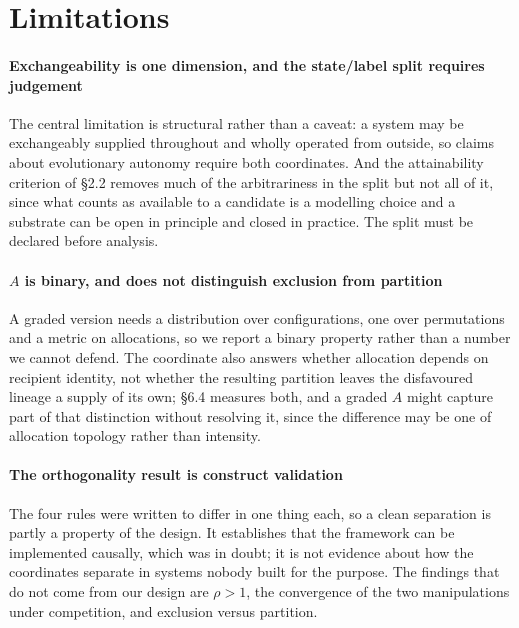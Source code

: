\documentclass[review,3p,times]{elsarticle}
\begin{document}
\section{Limitations}

\paragraph{Exchangeability is one dimension, and the state/label split
requires judgement} The central limitation is structural rather than a
caveat: a system may be exchangeably supplied throughout and wholly operated
from outside, so claims about evolutionary autonomy require both coordinates.
And the attainability criterion of \S2.2 removes much of the arbitrariness in
the split but not all of it, since what counts as available to a candidate is
a modelling choice and a substrate can be open in principle and closed in
practice. The split must be declared before analysis.

\paragraph{\texorpdfstring{$A$}{A} is binary, and does not distinguish exclusion from partition}
A graded version needs a distribution over configurations, one over
permutations and a metric on allocations, so we report a binary property
rather than a number we cannot defend. The coordinate also answers whether
allocation depends on recipient identity, not whether the resulting partition
leaves the disfavoured lineage a supply of its own; \S6.4 measures both, and a
graded $A$ might capture part of that distinction without resolving it, since
the difference may be one of allocation topology rather than intensity.

\paragraph{The orthogonality result is construct validation}
The four rules were written to differ in one thing each, so a clean separation
is partly a property of the design. It establishes that the framework can be
implemented causally, which was in doubt; it is not evidence about how the
coordinates separate in systems nobody built for the purpose. The
findings that do not come from our design are $\rho>1$, the convergence of the
two manipulations under competition, and exclusion versus partition.
\end{document}
